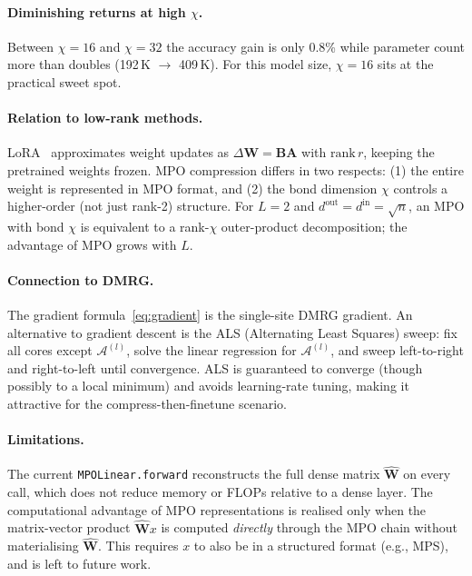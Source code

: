 \documentclass[11pt,a4paper]{article}
\newcommand{\mpomat}[1]{\mathbf{#1}}
\newcommand{\calA}{\mathcal{A}}
\theoremstyle{definition}
\begin{document}
\paragraph{Diminishing returns at high $\chi$.}
Between $\chi=16$ and $\chi=32$ the accuracy gain is only 0.8\% while parameter count more than doubles (192\,K $\to$ 409\,K). For this model size, $\chi=16$ sits at the practical sweet spot.

\paragraph{Relation to low-rank methods.}
LoRA~\citep{hu2022lora} approximates weight updates as $\Delta\mpomat{W} = \mpomat{B}\mpomat{A}$ with $\text{rank}\,r$, keeping the pretrained weights frozen. MPO compression differs in two respects: (1) the entire weight is represented in MPO format, and (2) the bond dimension $\chi$ controls a higher-order (not just rank-2) structure. For $L=2$ and $d^\text{out}=d^\text{in}=\sqrt{n}$, an MPO with bond $\chi$ is equivalent to a rank-$\chi$ outer-product decomposition; the advantage of MPO grows with $L$.

\paragraph{Connection to DMRG.}
The gradient formula~\eqref{eq:gradient} is the single-site DMRG gradient. An alternative to gradient descent is the ALS (Alternating Least Squares) sweep: fix all cores except $\calA^{(l)}$, solve the linear regression for $\calA^{(l)}$, and sweep left-to-right and right-to-left until convergence. ALS is guaranteed to converge (though possibly to a local minimum) and avoids learning-rate tuning, making it attractive for the compress-then-finetune scenario.

\paragraph{Limitations.}
The current \texttt{MPOLinear.forward} reconstructs the full dense matrix $\widehat{\mpomat{W}}$ on every call, which does not reduce memory or FLOPs relative to a dense layer. The computational advantage of MPO representations is realised only when the matrix-vector product $\widehat{\mpomat{W}} x$ is computed \emph{directly} through the MPO chain without materialising $\widehat{\mpomat{W}}$. This requires $x$ to also be in a structured format (e.g., MPS), and is left to future work.
\end{document}
